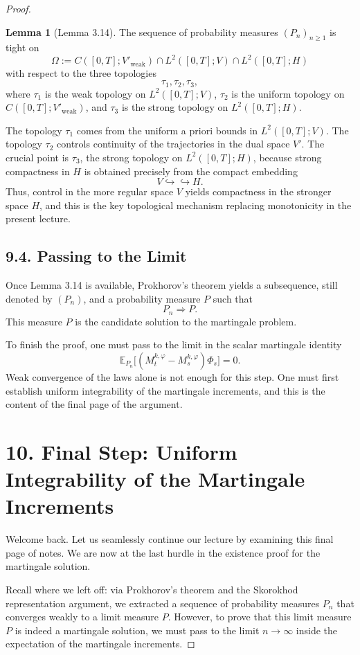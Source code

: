 \documentclass[11pt]{article}
\theoremstyle{definition}
\newtheorem{lemma}{Lemma}
\theoremstyle{remark}
\begin{document}
\begin{proof}
\begin{lemma}[Lemma 3.14]
The sequence of probability measures $(P_n)_{n\ge 1}$ is tight on
\[
  \Omega:=C([0,T];V'_{\mathrm{weak}})\cap L^2([0,T];V)\cap L^2([0,T];H)
\]
with respect to the three topologies
\[
  \tau_1,\tau_2,\tau_3,
\]
where $\tau_1$ is the weak topology on $L^2([0,T];V)$, $\tau_2$ is the uniform topology on $C([0,T];V'_{\mathrm{weak}})$, and $\tau_3$ is the strong topology on $L^2([0,T];H)$.
\end{lemma}

The topology $\tau_1$ comes from the uniform a priori bounds in $L^2([0,T];V)$. The topology $\tau_2$ controls continuity of the trajectories in the dual space $V'$. The crucial point is $\tau_3$, the strong topology on $L^2([0,T];H)$, because strong compactness in $H$ is obtained precisely from the compact embedding
\[
  V\hookrightarrow\hookrightarrow H.
\]
Thus, control in the more regular space $V$ yields compactness in the stronger space $H$, and this is the key topological mechanism replacing monotonicity in the present lecture.

\subsection*{9.4. Passing to the Limit}
Once Lemma 3.14 is available, Prokhorov's theorem yields a subsequence, still denoted by $(P_n)$, and a probability measure $P$ such that
\[
  P_n\Rightarrow P.
\]
This measure $P$ is the candidate solution to the martingale problem.

To finish the proof, one must pass to the limit in the scalar martingale identity
\[
  \mathbb E_{P_n}\bigl[(M_t^{k,\varphi}-M_s^{k,\varphi})\Phi_s\bigr]=0.
\]
Weak convergence of the laws alone is not enough for this step. One must first establish uniform integrability of the martingale increments, and this is the content of the final page of the argument.

\section*{10. Final Step: Uniform Integrability of the Martingale Increments}
Welcome back. Let us seamlessly continue our lecture by examining this final page of notes. We are now at the last hurdle in the existence proof for the martingale solution.

Recall where we left off: via Prokhorov's theorem and the Skorokhod representation argument, we extracted a sequence of probability measures $P_n$ that converges weakly to a limit measure $P$. However, to prove that this limit measure $P$ is indeed a martingale solution, we must pass to the limit $n\to\infty$ inside the expectation of the martingale increments.


\end{proof}
\end{document}
